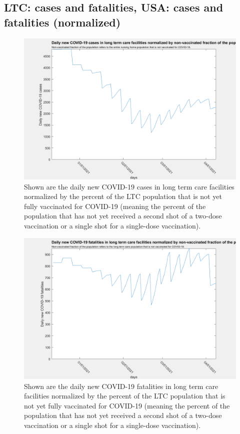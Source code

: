 \documentclass[twoside]{article}
\begin{document}
\begin{multicols}{2}
\subsection{LTC: cases and fatalities, USA: cases and fatalities (normalized)}

\begin{figure}[H]
	\includegraphics[width=\linewidth]{images/ltc_normalized_cases_vf.png}
	\caption{Shown are the daily new COVID-19 cases in long term care facilities normalized by the percent of the LTC population that is not yet fully vaccinated for COVID-19 (meaning the percent of the population that has not yet received a second shot of a two-dose vaccination or a single shot for a single-dose vaccination).}
	\label{fig:images/ltc_normalized_cases_vfLabel}
\end{figure}

\begin{figure}[H]
	\includegraphics[width=\linewidth]{images/ltc_normalized_fatalities_vf.png}
	\caption{Shown are the daily new COVID-19 fatalities in long term care facilities normalized by the percent of the LTC population that is not yet fully vaccinated for COVID-19 (meaning the percent of the population that has not yet received a second shot of a two-dose vaccination or a single shot for a single-dose vaccination).}
	\label{fig:images/ltc_normalized_fatalities_vfLabel}
\end{figure}


\end{multicols}
\end{document}
